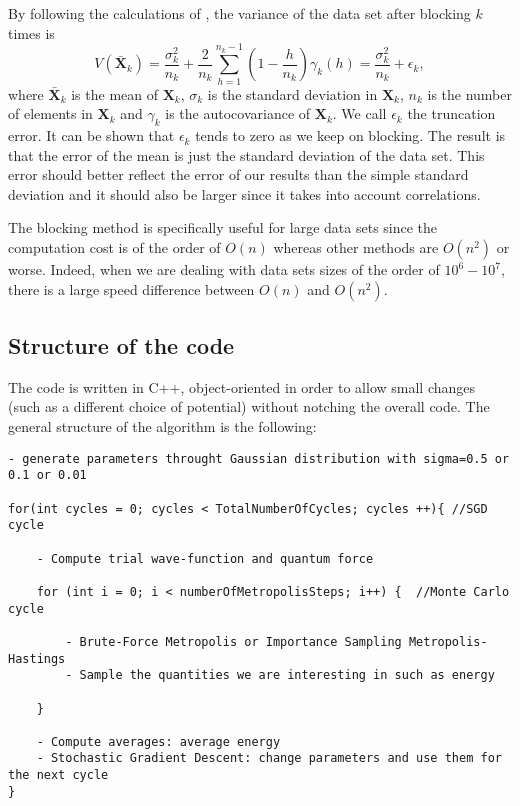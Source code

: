 By following the calculations of \cite{marius}, the variance of the data set after blocking $k$ times is
\begin{equation*}
V(\bar{\textbf{X}}_k) = \frac{\sigma^2_k}{n_k} + \frac{2}{n_k}\sum_{h=1}^{n_k-1}\left(  1-\frac{h}{n_k} \right)\gamma_k(h) = \frac{\sigma^2_k}{n_k} + \epsilon_k ,
\end{equation*}
where $\bar{\textbf{X}}_k$ is the mean of $\textbf{X}_k$, $\sigma_k$ is the standard deviation in $\textbf{X}_k$, $n_k$ is the number of elements in $\textbf{X}_k$ and $\gamma_k$ is the autocovariance of $\textbf{X}_k$. We call $\epsilon_k$ the truncation error. It can be shown \cite{marius} that $\epsilon_k$ tends to zero as we keep on blocking. The result is that the error of the mean is just the standard deviation of the data set. This error should better reflect the error of our results than the simple standard deviation and it should also be larger since it takes into account correlations.

The blocking method is specifically useful for large data sets since the computation cost is of the order of $O(n)$ whereas other methods are $O(n^2)$ or worse. Indeed, when we are dealing with data sets sizes of the order of $10^6 - 10^7$, there is a large speed difference between $O(n)$ and $O(n^2)$. 

\subsection{Structure of the code}
The code is written in C++, object-oriented in order to allow small changes (such as a different choice of potential) without notching the overall code. The general structure of the algorithm is the following:
  
\begin{lstlisting}
- generate parameters throught Gaussian distribution with sigma=0.5 or 0.1 or 0.01

for(int cycles = 0; cycles < TotalNumberOfCycles; cycles ++){ //SGD cycle
	
	- Compute trial wave-function and quantum force
	
	for (int i = 0; i < numberOfMetropolisSteps; i++) {  //Monte Carlo cycle
	
		- Brute-Force Metropolis or Importance Sampling Metropolis-Hastings
		- Sample the quantities we are interesting in such as energy
	
	}
	
	- Compute averages: average energy
	- Stochastic Gradient Descent: change parameters and use them for the next cycle
}
\end{lstlisting} 

